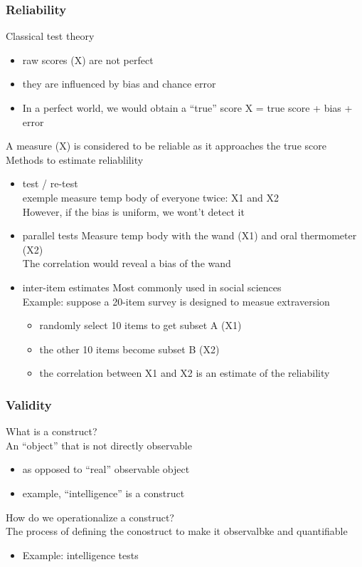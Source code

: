 \documentclass[11pt]{article}
\begin{document}
\subsubsection{Reliability}
\label{sec-2-4-1}

   Classical test theory
\begin{itemize}
\item raw scores (X) are not perfect
\item they are influenced by bias and chance error
\item In a perfect world, we would obtain a ``true'' score
     X = true score + bias + error
\end{itemize}
   A measure (X) is considered to be reliable as it approaches the true score
   Methods to estimate reliablility
\begin{itemize}
\item test / re-test\\
exemple measure temp body of everyone twice: X1 and X2\\
     However, if the bias is uniform, we wont't detect it
\item parallel tests
     Measure temp body with the wand (X1) and oral thermometer (X2)\\
     The correlation would reveal a bias of the wand
\item inter-item estimates
     Most commonly used in social sciences\\
     Example: suppose a 20-item survey is designed to measue extraversion
\begin{itemize}
\item randomly select 10 items to get subset A (X1)
\item the other 10 items become subset B (X2)
\item the correlation between X1 and X2 is an estimate of the reliability
\end{itemize}
\end{itemize}
\subsubsection{Validity}
\label{sec-2-4-2}

    What is a construct?\\ 
    An ``object''  that is not directly observable
\begin{itemize}
\item as opposed to ``real'' observable object
\item example, ``intelligence'' is a construct
\end{itemize}
    How do we operationalize a construct?\\
    The process of defining the conostruct to make it observalbke and quantifiable\\
\begin{itemize}
\item Example: intelligence tests
\end{itemize}
\end{document}
